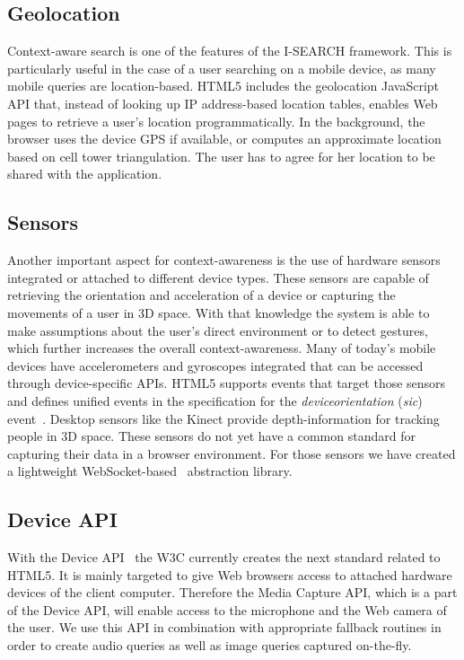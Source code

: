 \documentclass[runningheads,a4paper]{llncs} \usepackage[utf8]{inputenc}
\begin{document}
\subsection{Geolocation}
Context-aware search is one of the features of the \mbox{I-SEARCH} framework. This is particularly useful in the case of a user searching on a mobile device, as many mobile queries are location-based. HTML5 includes the geolocation JavaScript API that, instead of looking up IP address-based location tables, enables Web pages to retrieve a user's
location programmatically. In the background, the browser uses the device GPS if available, or computes an approximate location based on cell tower triangulation. The user has to agree for her location to be shared with the application.

\subsection{Sensors}
Another important aspect for context-awareness is the use of hardware sensors integrated or attached to different device types. These sensors are capable of retrieving the orientation and acceleration of a device or capturing the movements of a user in 3D space. With that knowledge the system is able to make assumptions about the user's
direct environment or to detect gestures, which further increases the overall context-awareness. Many of today's mobile devices have accelerometers and gyroscopes integrated that can be accessed through device-specific APIs. HTML5 supports events that target those sensors and defines unified events in the specification for the \emph{deviceorientation} (\textit{sic}) event~\cite{deviceOrientation}. Desktop sensors like the Kinect provide depth-information for tracking people in 3D space. These sensors do not yet have a common standard for capturing their data in a browser environment. For those sensors we have created a lightweight WebSocket-based~\cite{websockets} abstraction library.

\subsection{Device API}
With the Device API~\cite{deviceAPI} the W3C currently creates the next standard related to HTML5. It is mainly targeted to give Web browsers access to attached hardware devices of the client computer. Therefore the Media Capture API, which is a part of the Device API, will enable access to the microphone and the Web camera of the user. We use this API in combination with appropriate fallback routines in order to create audio queries as well as image queries captured on-the-fly.
\end{document}
